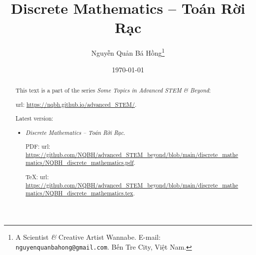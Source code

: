 \documentclass{article}
\title{Discrete Mathematics -- Toán Rời Rạc}
\author{Nguyễn Quản Bá Hồng\footnote{A Scientist {\it\&} Creative Artist Wannabe. E-mail: {\tt nguyenquanbahong@gmail.com}. Bến Tre City, Việt Nam.}}
\date{\today}
\begin{document}
\maketitle
\begin{abstract}
	This text is a part of the series {\it Some Topics in Advanced STEM \& Beyond}:
	
	{\sc url}: \url{https://nqbh.github.io/advanced_STEM/}.
	
	Latest version:
	\begin{itemize}
		\item {\it Discrete Mathematics -- Toán Rời Rạc}.
		
		PDF: {\sc url}: \url{https://github.com/NQBH/advanced_STEM_beyond/blob/main/discrete_mathematics/NQBH_discrete_mathematics.pdf}.
		
		\TeX: {\sc url}: \url{https://github.com/NQBH/advanced_STEM_beyond/blob/main/discrete_mathematics/NQBH_discrete_mathematics.tex}.
	\end{itemize}
\end{abstract}
\tableofcontents

\end{document}
